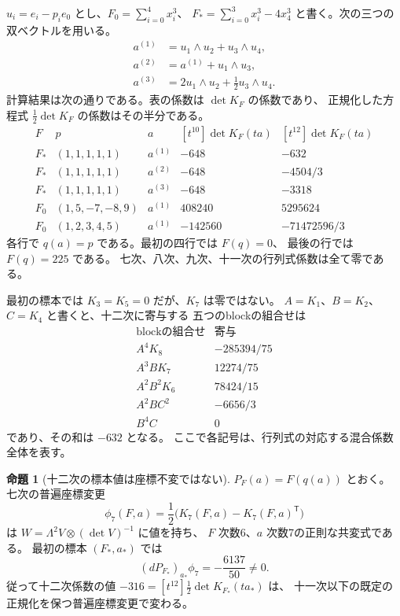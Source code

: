 \documentclass[a4paper,11pt]{ltjsarticle}
\theoremstyle{definition}
\newtheorem{proposition}[theorem]{命題}
\begin{document}
$u_i=e_i-p_i e_0$ とし、$F_0=\sum_{i=0}^4x_i^3$、
$F_*=\sum_{i=0}^3x_i^3-4x_4^3$ と書く。次の三つの双ベクトルを用いる。
\[
 \begin{aligned}
 a^{(1)}&=u_1\wedge u_2+u_3\wedge u_4,\\
 a^{(2)}&=a^{(1)}+u_1\wedge u_3,\\
 a^{(3)}&=2u_1\wedge u_2+\tfrac12u_3\wedge u_4.
 \end{aligned}
\]
計算結果は次の通りである。表の係数は $\det K_F$ の係数であり、
正規化した方程式 $\frac12\det K_F$ の係数はその半分である。
\[
\begin{array}{c|c|c|r|r}
 F &p&a&[t^{10}]\det K_F(ta)&[t^{12}]\det K_F(ta)\\ \hline
 F_*&(1,1,1,1,1)&a^{(1)}&-648&-632\\
 F_*&(1,1,1,1,1)&a^{(2)}&-648&-4504/3\\
 F_*&(1,1,1,1,1)&a^{(3)}&-648&-3318\\
 F_0&(1,5,-7,-8,9)&a^{(1)}&408240&5295624\\
 F_0&(1,2,3,4,5)&a^{(1)}&-142560&-71472596/3
\end{array}
\]
各行で $q(a)=p$ である。最初の四行では $F(q)=0$、
最後の行では $F(q)=225$ である。
七次、八次、九次、十一次の行列式係数は全て零である。

最初の標本では $K_3=K_5=0$ だが、$K_7$ は零ではない。
$A=K_1$、$B=K_2$、$C=K_4$ と書くと、十二次に寄与する
五つのblockの組合せは
\[
\begin{array}{c|r}
 \text{blockの組合せ}&\text{寄与}\\ \hline
 A^4K_8&-285394/75\\
 A^3BK_7&12274/75\\
 A^2B^2K_6&78424/15\\
 A^2BC^2&-6656/3\\
 B^4C&0
\end{array}
\]
であり、その和は $-632$ となる。
ここで各記号は、行列式の対応する混合係数全体を表す。

\begin{proposition}[十二次の標本値は座標不変ではない]
\label{prop:v9-twelfth-gauge}
$P_F(a)=F(q(a))$ とおく。
七次の普遍座標変更
\[
 \phi_7(F,a)=\frac12\bigl(K_7(F,a)-K_7(F,a)^{\mathsf T}\bigr)
\]
は $W=\Lambda^2V\otimes(\det V)^{-1}$ に値を持ち、
$F$ 次数6、$a$ 次数7の正則な共変式である。
最初の標本 $(F_*,a_*)$ では
\[
                    (dP_{F_*})_{a_*}\phi_7=-\frac{6137}{50}\ne0.
\]
従って十二次係数の値 $-316=[t^{12}]\frac12\det K_{F_*}(ta_*)$ は、
十一次以下の既定の正規化を保つ普遍座標変更で変わる。
\end{proposition}
\end{document}

